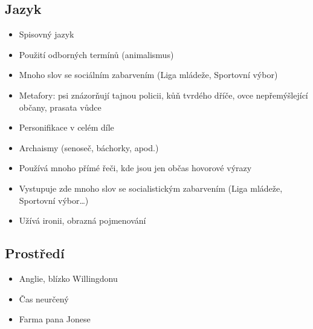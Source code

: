 \documentclass{article}
\begin{document}
\subsection{Jazyk}
\begin{itemize}
    \item Spisovný jazyk
    \item Použití odborných termínů (animalismus)
    \item Mnoho slov se sociálním zabarvením (Liga mládeže, Sportovní výbor)
    \item Metafory: psi znázorňují tajnou policii, kůň tvrdého dříče, ovce nepřemýšlející občany, prasata vůdce
    \item Personifikace v celém díle
    \item Archaismy (senoseč, báchorky, apod.)
    \item Používá mnoho přímé řeči, kde jsou jen občas hovorové výrazy
    \item Vystupuje zde mnoho slov se socialistickým zabarvením (Liga mládeže, Sportovní výbor…)
    \item Užívá ironii, obrazná pojmenování
\end{itemize}

\subsection{Prostředí}
\begin{itemize}
    \item Anglie, blízko Willingdonu
    \item Čas neurčený
    \item Farma pana Jonese
\end{itemize}
\end{document}
